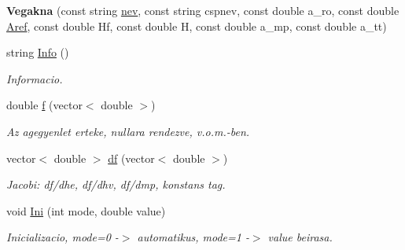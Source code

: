 \begin{DoxyCompactItemize}
\item 
\hypertarget{class_vegakna_ae4041ee2a843f526bebded5f99ff2824}{}\label{class_vegakna_ae4041ee2a843f526bebded5f99ff2824} 
{\bfseries Vegakna} (const string \hyperlink{class_agelem_abe92b7e3912367d5d1caf6b277ca0b7d}{nev}, const string cspnev, const double a\+\_\+ro, const double \hyperlink{class_agelem_a3f8668febc2958fd539997d537552f17}{Aref}, const double Hf, const double H, const double a\+\_\+mp, const double a\+\_\+tt)
\item 
\hypertarget{class_vegakna_a9b47670176b3cff6d577e7a5b7ef7eb2}{}\label{class_vegakna_a9b47670176b3cff6d577e7a5b7ef7eb2} 
string \hyperlink{class_vegakna_a9b47670176b3cff6d577e7a5b7ef7eb2}{Info} ()
\begin{DoxyCompactList}\small\item\em Informacio. \end{DoxyCompactList}\item 
\hypertarget{class_vegakna_a1f4c98796c6ceb9fbdd935b20af6ab42}{}\label{class_vegakna_a1f4c98796c6ceb9fbdd935b20af6ab42} 
double \hyperlink{class_vegakna_a1f4c98796c6ceb9fbdd935b20af6ab42}{f} (vector$<$ double $>$)
\begin{DoxyCompactList}\small\item\em Az agegyenlet erteke, nullara rendezve, v.\+o.\+m.-\/ben. \end{DoxyCompactList}\item 
\hypertarget{class_vegakna_ac76d7d751b9dd9f28b5470ea68625345}{}\label{class_vegakna_ac76d7d751b9dd9f28b5470ea68625345} 
vector$<$ double $>$ \hyperlink{class_vegakna_ac76d7d751b9dd9f28b5470ea68625345}{df} (vector$<$ double $>$)
\begin{DoxyCompactList}\small\item\em Jacobi\+: df/dhe, df/dhv, df/dmp, konstans tag. \end{DoxyCompactList}\item 
\hypertarget{class_vegakna_adaa3748adf56c35c7fb91d014eccb8fe}{}\label{class_vegakna_adaa3748adf56c35c7fb91d014eccb8fe} 
void \hyperlink{class_vegakna_adaa3748adf56c35c7fb91d014eccb8fe}{Ini} (int mode, double value)
\begin{DoxyCompactList}\small\item\em Inicializacio, mode=0 -\/$>$ automatikus, mode=1 -\/$>$ value beirasa. \end{DoxyCompactList}\item 
\hypertarget{class_vegakna_a6a5d3d90d5e0be90481bdd144c652208}{}\label{class_vegakna_a6a5d3d90d5e0be90481bdd144c652208} 

\end{DoxyCompactItemize}
